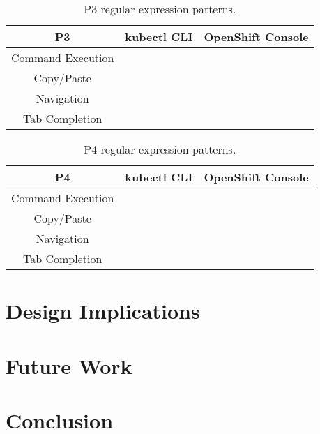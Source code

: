 \documentclass[11pt, oneside]{article}   	%
\begin{document}
\begin{table}
 \centering
  \begin{tabular}{ | c | c | c | } 
  \hline
  P3 & kubectl CLI & OpenShift Console \\ 
  \hline
  Command Execution &  &  \\ 
  \hline
  Copy/Paste & & \\
  \hline
  Navigation & & \\
  \hline
  Tab Completion & & \\
  \hline
  \end{tabular}
 \caption{P3 regular expression patterns.}
 \label{table:t8}
\end{table}

\begin{table}
 \centering
  \begin{tabular}{ | c | c | c | } 
  \hline
  P4 & kubectl CLI & OpenShift Console \\ 
  \hline
  Command Execution &  &  \\ 
  \hline
  Copy/Paste & & \\
  \hline
  Navigation & & \\
  \hline
  Tab Completion & & \\
  \hline
  \end{tabular}
 \caption{P4 regular expression patterns.}
 \label{table:t9}
\end{table}

\section{Design Implications}

\section{Future Work}

\section{Conclusion}



\end{document}
